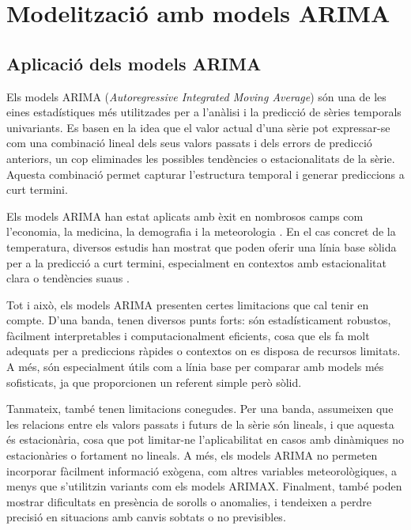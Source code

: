 \documentclass[../main.tex]{subfiles}
\begin{document}

\chapter{Modelització amb models ARIMA} \label{ch:Models ARIMA}

\section{Aplicació dels models ARIMA}

Els models ARIMA (\textit{Autoregressive Integrated Moving Average}) són una de les eines estadístiques més utilitzades per a l’anàlisi i la predicció de sèries temporals univariants. Es basen en la idea que el valor actual d’una sèrie pot expressar-se com una combinació lineal dels seus valors passats i dels errors de predicció anteriors, un cop eliminades les possibles tendències o estacionalitats de la sèrie. Aquesta combinació permet capturar l’estructura temporal i generar prediccions a curt termini.

Els models ARIMA han estat aplicats amb èxit en nombrosos camps com l’economia, la medicina, la demografia i la meteorologia \parencite{murat2018forecasting, elseidi2024hybrid}. En el cas concret de la temperatura, diversos estudis han mostrat que poden oferir una línia base sòlida per a la predicció a curt termini, especialment en contextos amb estacionalitat clara o tendències suaus \parencite{tugal2023analysis, koccak2023time}. 

Tot i això, els models ARIMA presenten certes limitacions que cal tenir en compte. D’una banda, tenen diversos punts forts: són estadísticament robustos, fàcilment interpretables i computacionalment eficients, cosa que els fa molt adequats per a prediccions ràpides o contextos on es disposa de recursos limitats. A més, són especialment útils com a línia base per comparar amb models més sofisticats, ja que proporcionen un referent simple però sòlid.

Tanmateix, també tenen limitacions conegudes. Per una banda, assumeixen que les relacions entre els valors passats i futurs de la sèrie són lineals, i que aquesta és estacionària, cosa que pot limitar-ne l’aplicabilitat en casos amb dinàmiques no estacionàries o fortament no lineals. A més, els models ARIMA no permeten incorporar fàcilment informació exògena, com altres variables meteorològiques, a menys que s’utilitzin variants com els models ARIMAX. Finalment, també poden mostrar dificultats en presència de sorolls o anomalies, i tendeixen a perdre precisió en situacions amb canvis sobtats o no previsibles.
\end{document}
